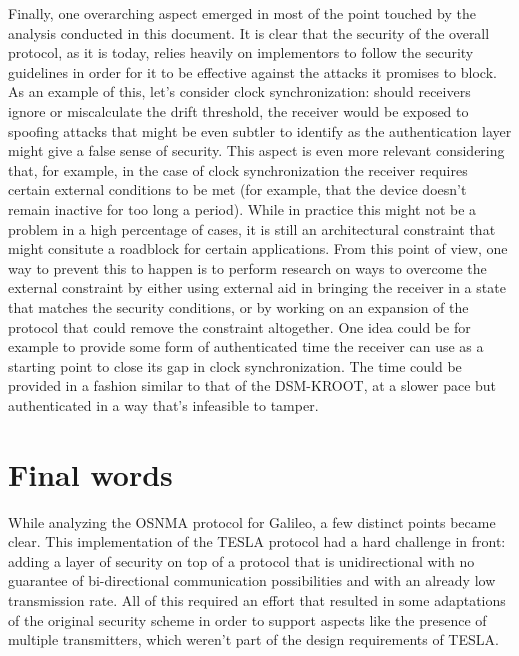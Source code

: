 \vspace{\baselineskip}

Finally, one overarching aspect emerged in most of the point touched by the
analysis conducted in this document. It is clear that the security of the
overall protocol, as it is today, relies heavily on implementors to follow the
security guidelines in order for it to be effective against the attacks it
promises to block. As an example of this, let's consider clock synchronization:
should receivers ignore or miscalculate the drift threshold, the receiver would
be exposed to spoofing attacks that might be even subtler to identify as the
authentication layer might give a false sense of security. This aspect is even
more relevant considering that, for example, in the case of clock
synchronization the receiver requires certain external conditions to be met (for
example, that the device doesn't remain inactive for too long a period). While
in practice this might not be a problem in a high percentage of cases, it is
still an architectural constraint that might consitute a roadblock for certain
applications. From this point of view, one way to prevent this to happen is to
perform research on ways to overcome the external constraint by either using
external aid in bringing the receiver in a state that matches the security
conditions, or by working on an expansion of the protocol that could remove the
constraint altogether. One idea could be for example to provide some form of
authenticated time the receiver can use as a starting point to close its gap in
clock synchronization. The time could be provided in a fashion similar to that
of the DSM-KROOT, at a slower pace but authenticated in a way that's infeasible
to tamper.

\section{Final words}

While analyzing the OSNMA protocol for Galileo, a few distinct points became
clear. This implementation of the TESLA protocol had a hard challenge in front:
adding a layer of security on top of a protocol that is unidirectional with no
guarantee of bi-directional communication possibilities and with an already low
transmission rate. All of this required an effort that resulted in some
adaptations of the original security scheme in order to support aspects like the
presence of multiple transmitters, which weren't part of the design requirements
of TESLA.

